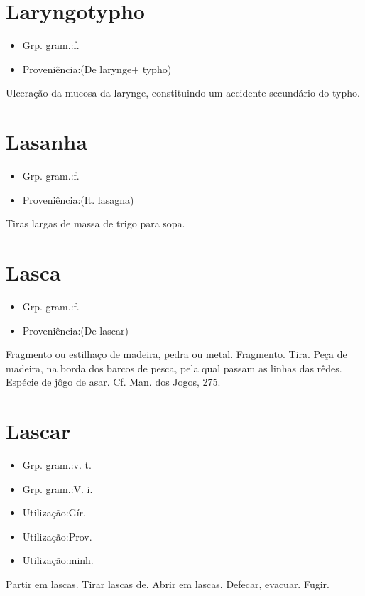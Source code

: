 \section{Laryngotypho}
\begin{itemize}
\item {Grp. gram.:f.}
\end{itemize}
\begin{itemize}
\item {Proveniência:(De \textunderscore larynge\textunderscore  + \textunderscore typho\textunderscore )}
\end{itemize}
Ulceração da mucosa da larynge, constituindo um accidente secundário do typho.
\section{Lasanha}
\begin{itemize}
\item {Grp. gram.:f.}
\end{itemize}
\begin{itemize}
\item {Proveniência:(It. \textunderscore lasagna\textunderscore )}
\end{itemize}
Tiras largas de massa de trigo para sopa.
\section{Lasca}
\begin{itemize}
\item {Grp. gram.:f.}
\end{itemize}
\begin{itemize}
\item {Proveniência:(De \textunderscore lascar\textunderscore )}
\end{itemize}
Fragmento ou estilhaço de madeira, pedra ou metal.
Fragmento.
Tira.
Peça de madeira, na borda dos barcos de pesca, pela qual passam as linhas das rêdes.
Espécie de jôgo de asar. Cf. \textunderscore Man. dos Jogos\textunderscore , 275.
\section{Lascar}
\begin{itemize}
\item {Grp. gram.:v. t.}
\end{itemize}
\begin{itemize}
\item {Grp. gram.:V. i.}
\end{itemize}
\begin{itemize}
\item {Utilização:Gír.}
\end{itemize}
\begin{itemize}
\item {Utilização:Prov.}
\end{itemize}
\begin{itemize}
\item {Utilização:minh.}
\end{itemize}
Partir em lascas.
Tirar lascas de.
Abrir em lascas.
Defecar, evacuar.
Fugir.

